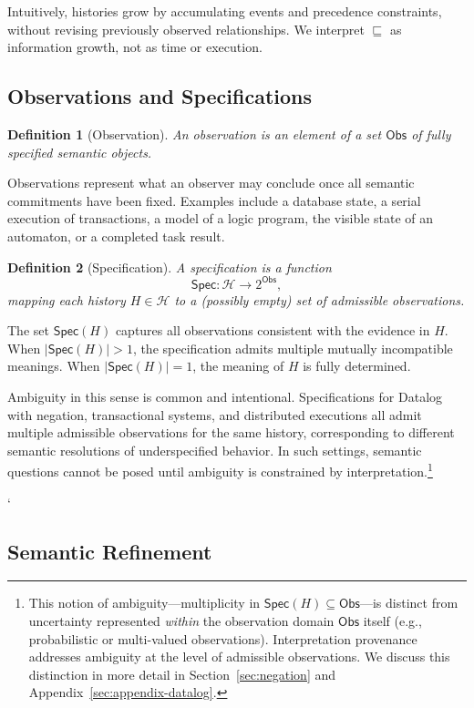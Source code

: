 \documentclass[acmsmall,nonacm]{acmart}
\newtheorem{definition}{Definition}
\theoremstyle{remark}
\numberwithin{definition}{section}
\numberwithin{theorem}{section}
\numberwithin{lemma}{section}
\numberwithin{corollary}{section}
\numberwithin{remark}{section}
\numberwithin{example}{section}
\numberwithin{observation}{section}
\numberwithin{assumption}{section}
\newcommand{\Hist}{\mathcal{H}}
\newcommand{\Obs}{\mathsf{Obs}}
\newcommand{\Spec}{\mathsf{Spec}}
\begin{document}
Intuitively, histories grow by accumulating events and precedence constraints,
without revising previously observed relationships.
We interpret $\sqsubseteq$ as information growth, not as time or execution.

\subsection{Observations and Specifications}

\begin{definition}[Observation]
An \emph{observation} is an element of a set $\Obs$ of fully specified semantic objects.
\end{definition}

Observations represent what an observer may conclude once all semantic commitments have
been fixed.
Examples include a database state, a serial execution of transactions, a model of
a logic program, the visible state of an automaton, or a completed task result.

\begin{definition}[Specification]
A \emph{specification} is a function
\[
  \Spec : \Hist \to 2^{\Obs},
\]
mapping each history $H \in \Hist$ to a (possibly empty) set of admissible observations.
\end{definition}

The set $\Spec(H)$ captures all observations consistent with the evidence in $H$.
When $|\Spec(H)| > 1$, the specification admits multiple mutually incompatible
meanings.
When $|\Spec(H)| = 1$, the meaning of $H$ is fully determined.

Ambiguity in this sense is common and intentional.
Specifications for Datalog with negation, transactional systems, and distributed
executions all admit multiple admissible observations for the same history,
corresponding to different semantic resolutions of underspecified behavior.
In such settings, semantic questions cannot be posed until ambiguity is constrained
by interpretation.\footnote{%
This notion of ambiguity—multiplicity in $\Spec(H) \subseteq \Obs$—is distinct from
uncertainty represented \emph{within} the observation domain $\Obs$ itself (e.g.,
probabilistic or multi-valued observations).
Interpretation provenance addresses ambiguity at the level of admissible
observations.
We discuss this distinction in more detail in Section~\ref{sec:negation} and
Appendix~\ref{sec:appendix-datalog}.}


`\subsection{Semantic Refinement}
\end{document}

